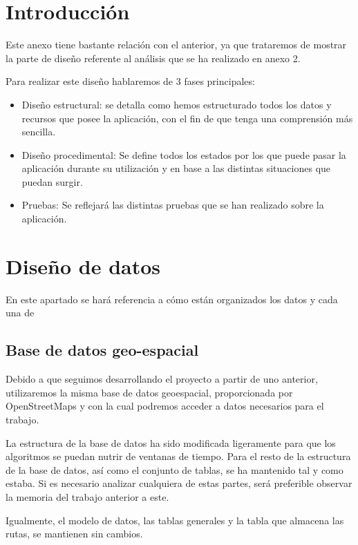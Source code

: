 
\section{Introducción}

Este anexo tiene bastante relación con el anterior, ya que trataremos de mostrar la parte de diseño referente al análisis que se ha realizado en anexo 2. 

Para realizar este diseño hablaremos de 3 fases principales:

\begin{itemize}
\item Diseño estructural: se detalla como hemos estructurado todos los datos y recursos que posee la aplicación, con el fin de que tenga una comprensión más sencilla.
\item Diseño procedimental: Se define todos los estados por los que puede pasar la aplicación durante su utilización y en base a las distintas situaciones que puedan surgir.
\item Pruebas: Se reflejará las distintas pruebas que se han realizado sobre la aplicación.
\end{itemize}

\section{Diseño de datos}

En este apartado se hará referencia a cómo están organizados los datos y cada una de 

\subsection{Base de datos geo-espacial}

Debido a que seguimos desarrollando el proyecto a partir de uno anterior, utilizaremos la misma base de datos geoespacial, proporcionada por OpenStreetMaps y con la cual podremos acceder a datos necesarios para el trabajo.

La estructura de la base de datos ha sido modificada ligeramente para que los algoritmos se puedan nutrir de ventanas de tiempo. Para el resto de la estructura de la base de datos, así como el conjunto de tablas, se ha mantenido tal y como estaba. Si es necesario analizar cualquiera de estas partes, será preferible observar la memoria del trabajo anterior a este.

Igualmente, el modelo de datos, las tablas generales y la tabla que almacena las rutas, se mantienen sin cambios.

